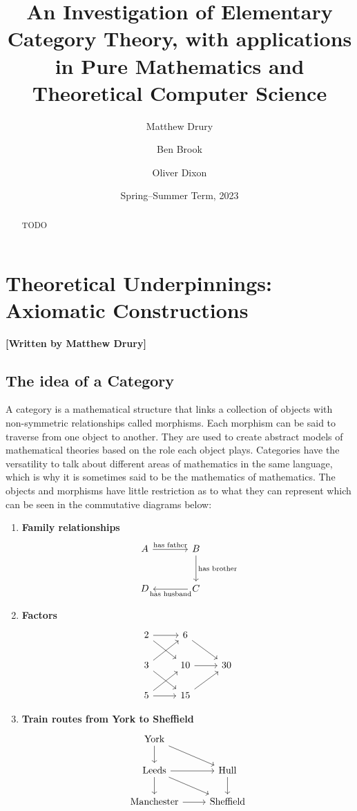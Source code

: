 \documentclass[10pt,a4paper,reqno]{amsart}
\title[An Investigation of Elementary Category Theory]{An Investigation of %
        Elementary Category Theory, with applications in Pure Mathematics and %
        Theoretical Computer Science}
\author{Matthew Drury} \email{\yorkemail{md1499}}
\author{Ben Brook}     \email{\yorkemail{bb1170}}
\author{Oliver Dixon}  \email{\yorkemail{od641}}
\date{Spring--Summer Term, 2023}
\numberwithin{figure}{section}
\begin{document}
\begin{abstract}
        TODO
\end{abstract}
\maketitle
\tableofcontents
\section{Theoretical %
        Underpinnings: Axiomatic Constructions}
\begin{flushright}
        \textbf{[Written by Matthew Drury]}
\end{flushright}


\subsection{The idea of a Category}
A category is a mathematical structure that links a collection of objects with
non-symmetric relationships called morphisms. Each morphism can be said to
traverse from one object to another. They are used to create abstract models of
mathematical theories based on the role each object plays. Categories have the
versatility to talk about different areas of mathematics in the same language,
which is why it is sometimes said to be the mathematics of mathematics. The
objects and morphisms have little restriction as to what they can represent
which can be seen in the commutative diagrams below:
\begin{enumerate}
\item \textbf{Family relationships}\begin{equation}
        \begin{tikzcd}[sep=large]
                A \ar[r,"\text{has father}"] & B \ar[d,"\text{has brother}"] \\
                D & C \ar[l,"\text{has husband}"]
        \end{tikzcd}
\end{equation}
\item \textbf{Factors}\begin{equation}
        \begin{tikzcd}
                2 \ar[r] \ar[dr] & 6 \ar[dr]\\
                3 \ar[ur] \ar[dr] & 10 \ar[r] & 30\\
                5 \ar[ur] \ar[r] & 15 \ar[ur]
        \end{tikzcd}
\end{equation}
\item \textbf{Train routes from York to Sheffield}\begin{equation}
        \begin{tikzcd}
                \text{York} \ar[d] \ar[dr] \\
                \text{Leeds} \ar[d] \ar[dr] \ar[r] & \text{Hull} \ar[d] \\
                \text{Manchester} \ar[r] & \text{Sheffield}
        \end{tikzcd}
\end{equation}
\end{enumerate}
\end{document}
